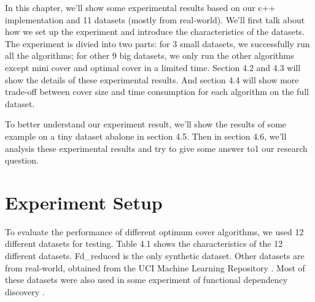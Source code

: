 \documentclass[11pt]{book}
\begin{document}
In this chapter, we'll show some experimental results based on our c++ implementation and 11 datasets (mostly from real-world). We'll first talk about how we set up the experiment and introduce the characteristics of the datasets. The experiment is divied into two parts: for 3 small datasets, we successfully run all the algorithms; for other 9 big datasets, we only run the other algorithms except mini cover and optimal cover in a limited time. Section 4.2 and 4.3 will show the details of these experimental results. And section 4.4 will show more trade-off between cover size and time consumption for each algorithm on the full dataset.

To better understand our experiment result, we'll show the results of some example on a tiny dataset abalone in section 4.5. Then in section 4.6, we'll analysis these experimental results and try to give some answer to1 our research question.

\section{Experiment Setup}
	
To evaluate the performance of different optimum cover algorithms, we used 12 different datasets for testing. Table 4.1 shows the characteristics of the 12 different datasets. Fd\_reduced is the only synthetic dataset. Other datasets are from real-world, obtained from the UCI Machine Learning Repository \cite{asuncion2007uci}. Most of these datasets were also  used in some experiment of functional dependency discovery \cite{papenbrock2015functional}.
\end{document}
